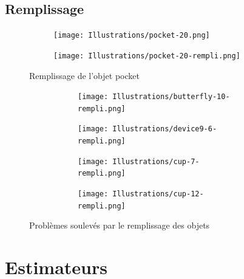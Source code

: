 \documentclass{article}
\begin{document}
    \subsection{Remplissage}
    
      \begin{figure}[!h]
	\centering
	\begin{subfigure}{.25\textwidth}
	  \centering
	  \texttt{[image: Illustrations/pocket-20.png]}
	  \label{pocket-non-rempli}
	\end{subfigure}
	\begin{subfigure}{.25\textwidth}
	  \centering
	  \texttt{[image: Illustrations/pocket-20-rempli.png]}
	\label{pocket-rempli}
	\end{subfigure}
	\caption{Remplissage de l'objet pocket}
	\label{remplissage}
      \end{figure}
      
      \begin{figure}[!h]
	\centering
	\begin{subfigure}{.47\textwidth}
	  \begin{subfigure}{.52\textwidth}
	    \centering
	    \texttt{[image: Illustrations/butterfly-10-rempli.png]}
	    \label{butterfly-rempli}
	  \end{subfigure}
	  \begin{subfigure}{.45\textwidth}
	    \centering
	    \texttt{[image: Illustrations/device9-6-rempli.png]}
	    \label{spirale-rempli}
	  \end{subfigure}
	\end{subfigure}
	\begin{subfigure}{.44\textwidth}
	  \begin{subfigure}{.46\textwidth}
	    \centering
	    \texttt{[image: Illustrations/cup-7-rempli.png]}
	  \label{1stcup-rempli}
	  \end{subfigure}
	  \begin{subfigure}{.46\textwidth}
	    \centering
	    \texttt{[image: Illustrations/cup-12-rempli.png]}
	  \label{2ndcup-rempli}
	  \end{subfigure}
	\end{subfigure}
	\caption{Problèmes soulevés par le remplissage des objets}
	\label{problèmes-remplissage}
      \end{figure}      
   
  \section{Estimateurs}
  
\end{document}
